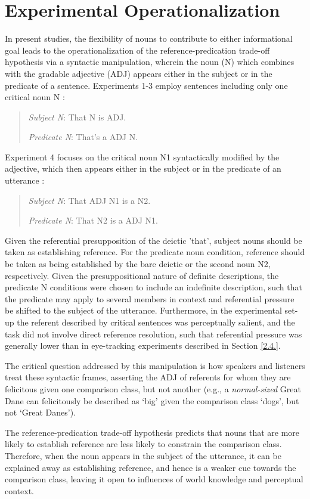 \section{Experimental Operationalization}
\label{3.2.}
In present studies, the flexibility of nouns to contribute to either informational goal leads to the operationalization of the reference-predication trade-off hypothesis via a syntactic manipulation, wherein the noun (N) which combines with the gradable adjective (ADJ) appears either in the subject or in the predicate of a sentence. Experiments 1-3 employ sentences including only one critical noun N \parencite{tessler2020}:
\begin{quotation}
	\textit{Subject N}: That N is ADJ. 
	
	\textit{Predicate N}: That's a ADJ N.
\end{quotation}
Experiment 4 focuses on the critical noun N1 syntactically modified by the adjective, which then appears either in the subject or in the predicate of an utterance \parencite{TesslerEtAl2020AMLaP}: 
\begin{quotation}
	\textit{Subject N}: That ADJ N1 is a N2. 
	 
	\textit{Predicate N}: That N2 is a ADJ N1.
\end{quotation} 
Given the referential presupposition of the deictic 'that', subject nouns should be taken as establishing reference.  For the predicate noun condition, reference should be taken as being established by the bare deictic or the second noun N2, respectively. Given the presuppositional nature of definite descriptions, the predicate N conditions were chosen to include an indefinite description, such that the predicate may apply to several members in context and referential pressure be shifted to the subject of the utterance. Furthermore, in the experimental set-up the referent described by critical sentences was perceptually salient, and the task did not involve direct reference resolution, such that referential pressure was generally lower than in eye-tracking experiments described in Section \ref{2.4.}.

The critical question addressed by this manipulation is how speakers and listeners treat these syntactic frames, asserting the ADJ of referents for whom they are felicitous given one comparison class, but not another (e.g., a \emph{normal-sized} Great Dane can felicitously be described as ‘big’ given the comparison class ‘dogs’, but not ‘Great Danes’). 

The reference-predication trade-off hypothesis predicts that nouns that are more likely to establish reference are less likely to constrain the comparison class. Therefore, when the noun appears in the subject of the utterance, it can be explained away as establishing reference, and hence is a weaker cue towards the comparison class, leaving it open to influences of world knowledge and perceptual context. 

